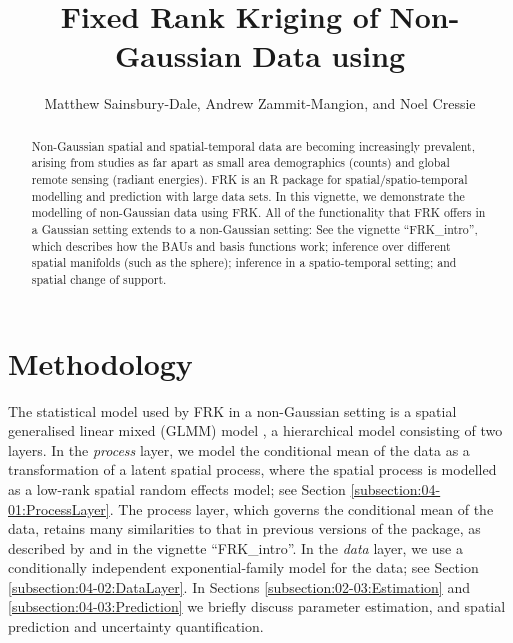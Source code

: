 \documentclass{article}\usepackage[]{graphicx}\usepackage[]{color}
\author{Matthew Sainsbury-Dale, Andrew Zammit-Mangion, and Noel Cressie}
\title{Fixed Rank Kriging of Non-Gaussian Data using \pkg{FRK}}
\newcommand{\pkg}[1]{{\fontseries{b}\selectfont #1}}
\let\proglang=\textsf
\begin{document}
\maketitle

\begin{abstract}
 Non-Gaussian spatial and spatial-temporal data are becoming increasingly prevalent, arising from studies as far apart as small area demographics (counts) and global remote sensing (radiant energies). 
  \pkg{FRK} is an \proglang{R} package for spatial/spatio-temporal modelling and prediction with large data sets. 
In this vignette, we demonstrate the modelling of non-Gaussian data using \pkg{FRK}. 
 All of the functionality that \pkg{FRK} offers in a Gaussian setting extends to a non-Gaussian setting: See the vignette ``FRK\_intro'', which describes how the BAUs and basis functions work; inference over different spatial manifolds (such as the sphere); inference in a spatio-temporal setting; and spatial change of support. 
\end{abstract}



\tableofcontents 



\section{Methodology}\label{SEC:Methodology}

The statistical model used by \pkg{FRK} in a non-Gaussian setting is a spatial generalised linear mixed (GLMM) model \citep{Diggle_1998_spatial_GLMM}, a hierarchical model consisting of two layers.
 In the \textit{process} layer, we model the conditional mean of the data as a transformation of a latent spatial process, where the spatial process is modelled as a low-rank spatial random effects model; see Section  \ref{subsection:04-01:ProcessLayer}. 
 The process layer, which governs the conditional mean of the data, retains many similarities to that in previous versions of the package, as described by \cite{FRK_paper} and in the vignette ``FRK\_intro''. 
 In the \textit{data} layer, we use a conditionally independent exponential-family model for the data; see Section \ref{subsection:04-02:DataLayer}. 
In Sections \ref{subsection:02-03:Estimation} and \ref{subsection:04-03:Prediction} we briefly discuss parameter estimation, and spatial prediction and uncertainty quantification.
\end{document}
